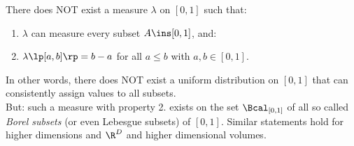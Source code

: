 \begin{Thm}%
   \label{thm-non-lebesgue}
    There does NOT exist a measure $\lambda$ on $[0,1]$ such that:
    \begin{enumerate}
        \item $\lambda$ can measure every subset $A \ins [0,1]$, and:
        \item $\lambda\lp[a,b] \rp = b-a$ for all $a\le b$ with $a,b \in [0,1]$.
    \end{enumerate}
    In other words, there does NOT exist a uniform distribution on $[0,1]$ that can consistently assign values to all subsets.\\
    But: such a measure with property 2. exists on the set $\Bcal_{[0,1]}$ of all so called \emph{Borel subsets} (or even Lebesgue subsets) 
    of $[0,1]$.
    Similar statements hold for higher dimensions and $\R^D$ and higher dimensional volumes.
\end{Thm}


